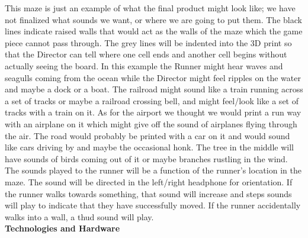 \documentclass[12pt]{article}
\begin{document}
\indent This maze is just an example of what the final product might look like; we have not finalized what sounds we want, or where we are going to put them.  The black lines indicate raised walls that would act as the walls of the maze which the game piece cannot pass through.  The grey lines will be indented into the 3D print so that the Director can tell where one cell ends and another cell begins without actually seeing the board.  In this example the Runner might hear waves and seagulls coming from the ocean while the Director might feel ripples on the water and maybe a dock or a boat.  The railroad might sound like a train running across a set of tracks or maybe a railroad crossing bell, and might feel/look like a set of tracks with a train on it.  As for the airport we thought we would print a run way with an airplane on it which might give off the sound of airplanes flying through the air.  The road would probably be printed with a car on it and would sound like cars driving by and maybe the occasional honk.  The tree in the middle will have sounds of birds coming out of it or maybe branches rustling in the wind.\\
\indent The sounds played to the runner will be a function of the runner's location in the maze. The sound will be directed in the left/right headphone for orientation. If the runner walks towards something, that sound will increase and steps sounds will play to indicate that they have successfully moved. If the runner accidentally walks into a wall, a thud sound will play.\\

\textbf{\large Technologies and Hardware}\\
\end{document}
